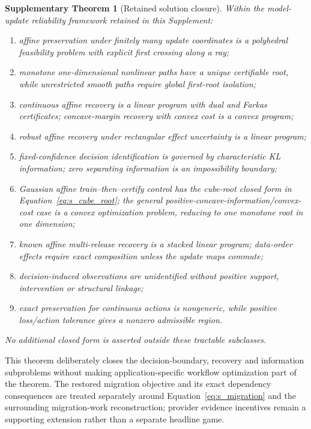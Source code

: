 \documentclass[11pt,letterpaper]{article}
\theoremstyle{plain}
\newtheorem{theorem}{Supplementary Theorem}
\newcommand{\1}{\mathbf 1}
\begin{document}
\begin{theorem}[Retained solution closure]
Within the model-update reliability framework retained in this Supplement:
\begin{enumerate}
\item affine preservation under finitely many update coordinates is a polyhedral feasibility problem with explicit first crossing along a ray;
\item monotone one-dimensional nonlinear paths have a unique certifiable root, while unrestricted smooth paths require global first-root isolation;
\item continuous affine recovery is a linear program with dual and Farkas certificates; concave-margin recovery with convex cost is a convex program;
\item robust affine recovery under rectangular effect uncertainty is a linear program;
\item fixed-confidence decision identification is governed by characteristic KL information; zero separating information is an impossibility boundary;
\item Gaussian affine train--then--certify control has the cube-root closed form in Equation~\ref{eq:s_cube_root}; the general positive-concave-information/convex-cost case is a convex optimization problem, reducing to one monotone root in one dimension;
\item known affine multi-release recovery is a stacked linear program; data-order effects require exact composition unless the update maps commute;
\item decision-induced observations are unidentified without positive support, intervention or structural linkage;
\item exact preservation for continuous actions is nongeneric, while positive loss/action tolerance gives a nonzero admissible region.
\end{enumerate}
No additional closed form is asserted outside these tractable subclasses.
\end{theorem}

This theorem deliberately closes the decision-boundary, recovery and information subproblems without making application-specific workflow optimization part of the theorem. The restored migration objective and its exact dependency consequences are treated separately around Equation~\ref{eq:s_migration} and the surrounding migration-work reconstruction; provider evidence incentives remain a supporting extension rather than a separate headline game.
\end{document}
